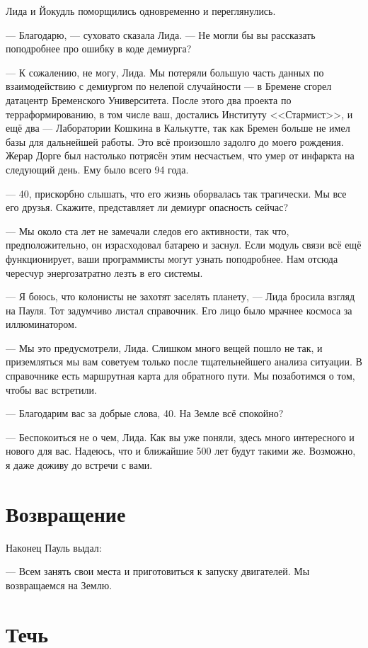 Лида и Йокудль поморщились одновременно и переглянулись.

--- Благодарю, --- суховато сказала Лида.
--- Не могли бы вы рассказать поподробнее про ошибку в коде демиурга?

--- К сожалению, не могу, Лида.
Мы потеряли большую часть данных по взаимодействию с демиургом по нелепой случайности --- в Бремене сгорел датацентр Бременского Университета.
После этого два проекта по терраформированию, в том числе ваш, достались Институту <<Стармист>>, и ещё два --- Лаборатории Кошкина в Калькутте, так как Бремен больше не имел базы для дальнейшей работы.
Это всё произошло задолго до моего рождения.
Жерар Дорге был настолько потрясён этим несчастьем, что умер от инфаркта на следующий день.
Ему было всего 94 года.

--- 40, прискорбно слышать, что его жизнь оборвалась так трагически.
Мы все его друзья.
Скажите, представляет ли демиург опасность сейчас?

--- Мы около ста лет не замечали следов его активности, так что, предположительно, он израсходовал батарею и заснул.
Если модуль связи всё ещё функционирует, ваши программисты могут узнать поподробнее.
Нам отсюда чересчур энергозатратно лезть в его системы.

--- Я боюсь, что колонисты не захотят заселять планету, --- Лида бросила взгляд на Пауля.
Тот задумчиво листал справочник.
Его лицо было мрачнее космоса за иллюминатором.

--- Мы это предусмотрели, Лида.
Слишком много вещей пошло не так, и приземляться мы вам советуем только после тщательнейшего анализа ситуации.
В справочнике есть маршрутная карта для обратного пути.
Мы позаботимся о том, чтобы вас встретили.

--- Благодарим вас за добрые слова, 40.
На Земле всё спокойно?

--- Беспокоиться не о чем, Лида.
Как вы уже поняли, здесь много интересного и нового для вас.
Надеюсь, что и ближайшие 500 лет будут такими же.
Возможно, я даже доживу до встречи с вами.

\section{Возвращение}

Наконец Пауль выдал:

--- Всем занять свои места и приготовиться к запуску двигателей.
Мы возвращаемся на Землю.

\section{Течь}


